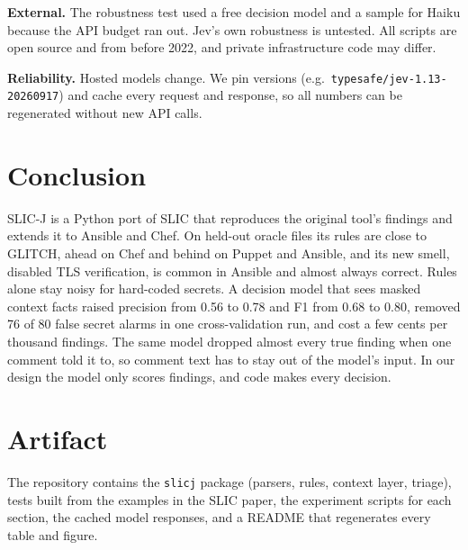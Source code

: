 \documentclass[conference]{IEEEtran}
\newcommand{\slicj}{SLIC-J}
\begin{document}
\textbf{External.} The robustness test used a free decision model and a sample for Haiku because the API budget ran
out. Jev's own robustness is untested. All scripts are open source and from before 2022, and private infrastructure
code may differ.

\textbf{Reliability.} Hosted models change. We pin versions (e.g.\ \texttt{typesafe/jev-1.13-20260917}) and cache every
request and response, so all numbers can be regenerated without new API calls.

\section{Conclusion}
\slicj{} is a Python port of SLIC that reproduces the original tool's findings and extends it to Ansible and Chef. On
held-out oracle files its rules are close to GLITCH, ahead on Chef and behind on Puppet and Ansible, and its new smell,
disabled TLS verification, is common in Ansible and almost always correct. Rules alone stay noisy for hard-coded
secrets. A decision model that sees masked context facts raised precision from 0.56 to 0.78 and F1 from 0.68 to 0.80,
removed 76 of 80 false secret alarms in one cross-validation run, and cost a few cents per thousand findings. The same model dropped almost every
true finding when one comment told it to, so comment text has to stay out of the model's input. In our design the
model only scores findings, and code makes every decision.

\section*{Artifact}
The repository contains the \texttt{slicj} package (parsers, rules, context layer, triage), tests built from the
examples in the SLIC paper, the experiment scripts for each section, the cached model responses, and a README that
regenerates every table and figure.



\end{document}
